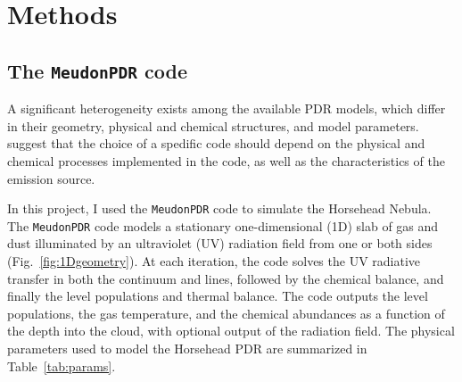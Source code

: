 \documentclass[12pt,a4paper]{article}
\newcommand{\mdpdr}{\texttt{MeudonPDR} code}
\begin{document}
\section{Methods}
\subsection{The \mdpdr{}}
A significant heterogeneity exists among the available PDR models, which differ in their geometry, physical and chemical structures, and model parameters. \textcite{Röllig2007} suggest that the choice of a spedific code should depend on the physical and chemical processes implemented in the code, as well as the characteristics of the emission source. 

In this project, I used the \mdpdr{} \parencite{LePetit2006,Goicoechea2007,Gonzalez2008,LeBourlot2012,Bron_thesis,Bron2014,Bron2016} to simulate the Horsehead Nebula. The \mdpdr{} models a stationary one-dimensional (1D) slab of gas and dust illuminated by an ultraviolet (UV) radiation field from one or both sides (Fig.~\ref{fig:1Dgeometry}). At each iteration, the code solves the UV radiative transfer in both the continuum and lines, followed by the chemical balance, and finally the level populations and thermal balance. The code outputs the level populations, the gas temperature, and the chemical abundances as a function of the depth into the cloud, with optional output of the radiation field. The physical parameters used to model the Horsehead PDR are summarized in Table~\ref{tab:params}.
\end{document}
